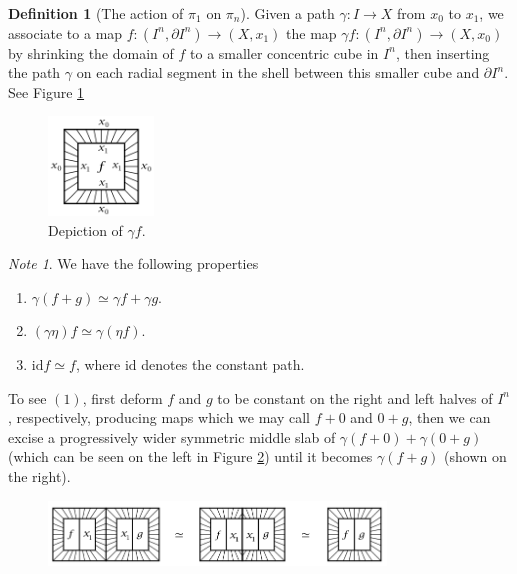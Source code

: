 \documentclass[reqno]{amsart}
\theoremstyle{definition}
\newtheorem{definition}[theorem]{Definition}
\theoremstyle{remark}
\newtheorem*{note}{Note}
\newcommand{\id}{{\mathrm{id}}}
\begin{document}
  \begin{definition}[The action of $\pi_1$ on $\pi_n$]
      Given a path
      $\gamma \colon I \to X$ from
      $x_0$ to $x_1$, we associate to a map
      $f \colon \left( I^{n}, \partial I^{n} \right) \to 
      \left( X, x_1 \right) $ the map
      $\gamma f \colon \left( I^{n}, \partial I^{n} \right) 
      \to \left( X,x_0 \right) $ by shrinking the domain
      of $f$ to a smaller concentric cube in $I^{n}$, then
      inserting the path $\gamma$ on each radial segment
      in the shell between this smaller cube and $\partial
      I^{n}$.
      See Figure \ref{fig:JDWIXHHX011SJ-png}

      \begin{figure}[htpb]
          \centering
          \includegraphics[width=0.25\textwidth]{JDWIXHHX011SJ.png}
          \caption{Depiction of $\gamma f$.}
          \label{fig:JDWIXHHX011SJ-png}
      \end{figure}

  \begin{note}
      We have the following properties
      \begin{enumerate}
          \item $\gamma \left( f+ g \right) 
              \simeq \gamma f + \gamma g$.
          \item $\left( \gamma \eta \right) f \simeq
              \gamma \left( \eta f \right) $.
          \item $\id f \simeq f$, where
              $\id$ denotes the constant path.
      \end{enumerate}

      To see $(1)$, first deform $f$ and $g$ to be
      constant on the right and left halves of
      $I^{n}$, respectively, producing maps
      which we may call $f+0$ and $0+g$, then we 
      can excise a progressively wider symmetric middle slab
      of $\gamma (f+0) + \gamma(0+g)$ (which can be
      seen on the left in Figure \ref{fig:WIWIWSSK11-png})
      until it becomes $\gamma \left( f+g \right) $ (shown on the
      right).

      \begin{figure}[htpb]
          \centering
          \includegraphics[width=0.8\textwidth]{WIWIWSSK11.png}
          \caption{}
          \label{fig:WIWIWSSK11-png}
      \end{figure}
  \end{note}


\end{definition}
\end{document}
